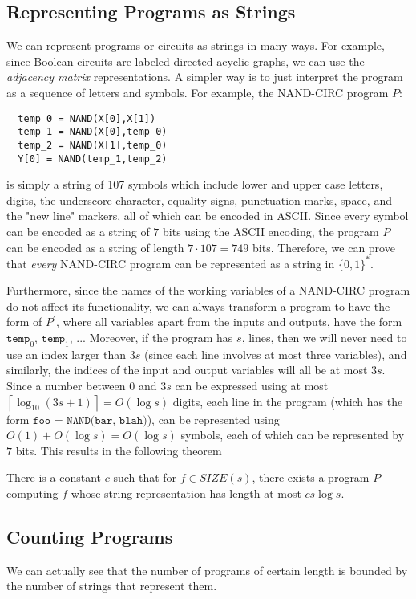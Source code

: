 \documentclass{article}
\begin{document}
  \subsection{Representing Programs as Strings}
  We can represent programs or circuits as strings in many ways. For example, since Boolean circuits are labeled directed acyclic graphs, we can use the \textit{adjacency matrix} representations. A simpler way is to just interpret the program as a sequence of letters and symbols. For example, the NAND-CIRC program $P$: 
  \begin{lstlisting}
  temp_0 = NAND(X[0],X[1])
  temp_1 = NAND(X[0],temp_0)
  temp_2 = NAND(X[1],temp_0)
  Y[0] = NAND(temp_1,temp_2)
  \end{lstlisting}
  is simply a string of 107 symbols which include lower and upper case letters, digits, the underscore character, equality signs, punctuation marks, space, and the "new line" markers, all of which can be encoded in ASCII. Since every symbol can be encoded as a string of $7$ bits using the ASCII encoding, the program $P$ can be encoded as a string of length $7 \cdot 107 = 749$ bits. Therefore, we can prove that \textit{every} NAND-CIRC program can be represented as a string in $\{0,1\}^*$. 

  Furthermore, since the names of the working variables of a NAND-CIRC program do not affect its functionality, we can always transform a program to have the form of $P^\prime$, where all variables apart from the inputs and outputs, have the form $\texttt{temp}_0$, $\texttt{temp}_1$, ... Moreover, if the program has $s$, lines, then we will never need to use an index larger than $3s$ (since each line involves at most three variables), and similarly, the indices of the input and output variables will all be at most $3s$. Since a number between $0$ and $3s$ can be expressed using at most $\left\lceil{\log_{10} (3s+1)} \right\rceil = O(\log s)$ digits, each line in the program (which has the form $\texttt{foo = NAND(bar, blah)}$), can be represented using $O(1) + O(\log s) = O(\log s)$ symbols, each of which can be represented by $7$ bits. This results in the following theorem 

  \begin{theorem}
  There is a constant $c$ such that for $f \in SIZE(s)$, there exists a program $P$ computing $f$ whose string representation has length at most $cs \log s$. 
  \end{theorem}

  \subsection{Counting Programs}
  We can actually see that the number of programs of certain length is bounded by the number of strings that represent them. 
\end{document}
